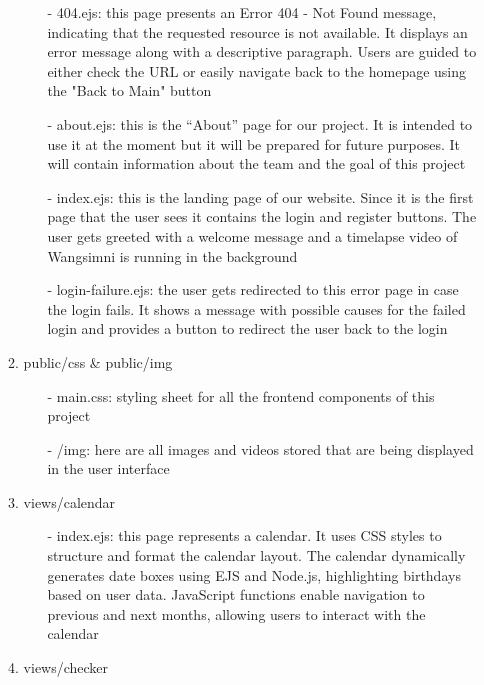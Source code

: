 \documentclass[conference]{IEEEtran}
\begin{document}
\begin{enumerate}
\begin{enumerate}
\begin{itemize}
                    \item[-] 404.ejs: this page presents an Error 404 - Not Found message, indicating that the requested resource is not available. It displays an error message along with a descriptive paragraph. Users are guided to either check the URL or easily navigate back to the homepage using the "Back to Main" button
                    \item[-] about.ejs: this is the “About” page for our project. It is intended to use it at the moment but it will be prepared for future purposes. It will contain information about the team and the goal of this project
                    \item[-] index.ejs: this is the landing page of our website. Since it is the first page that the user sees it contains the login and register buttons. The user gets greeted with a welcome message and a timelapse video of Wangsimni is running in the background
                    \item[-] login-failure.ejs: the user gets redirected to this error page in case the login fails. It shows a message with possible causes for the failed login and provides a button to redirect the user back to the login
                \end{itemize}
            \item public/css \& public/img
                \begin{itemize}
                    \item[-] main.css: styling sheet for all the frontend components of this project
                    \item[-] /img: here are all images and videos stored that are being displayed in the user interface
                \end{itemize}
            \item views/calendar
                \begin{itemize}
                    \item[-] index.ejs: this page represents a calendar. It uses CSS styles to structure and format the calendar layout. The calendar dynamically generates date boxes using EJS and Node.js, highlighting birthdays based on user data. JavaScript functions enable navigation to previous and next months, allowing users to interact with the calendar
                \end{itemize}
            \item views/checker
                \begin{itemize}

\end{itemize}
\end{enumerate}
\end{enumerate}
\end{document}
